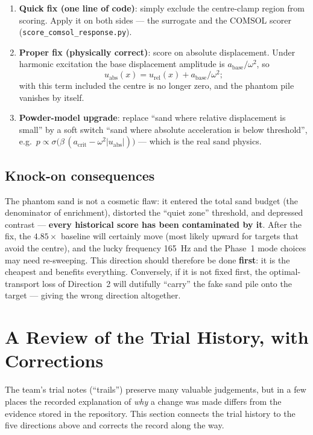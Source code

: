 \documentclass[11pt,a4paper]{article}
\newcommand{\code}[1]{\texttt{#1}}
\begin{document}
\begin{enumerate}[leftmargin=2em]
\item \textbf{Quick fix (one line of code)}: simply exclude the centre-clamp region from scoring. Apply it on both sides --- the surrogate and the COMSOL scorer (\code{score\_comsol\_response.py}).
\item \textbf{Proper fix (physically correct)}: score on absolute displacement. Under harmonic excitation the base displacement amplitude is $a_{\mathrm{base}}/\omega^2$, so
\begin{equation}
u_{\mathrm{abs}}(x) = u_{\mathrm{rel}}(x) + a_{\mathrm{base}}/\omega^{2};
\end{equation}
with this term included the centre is no longer zero, and the phantom pile vanishes by itself.
\item \textbf{Powder-model upgrade}: replace ``sand where relative displacement is small'' by a soft switch ``sand where absolute acceleration is below threshold'', e.g.\ $p \propto \sigma\!\bigl(\beta\,(a_{\mathrm{crit}}-\omega^2|u_{\mathrm{abs}}|)\bigr)$ --- which is the real sand physics.
\end{enumerate}

\subsection{Knock-on consequences}

The phantom sand is not a cosmetic flaw: it entered the total sand budget (the denominator of enrichment), distorted the ``quiet zone'' threshold, and depressed contrast --- \textbf{every historical score has been contaminated by it}. After the fix, the $4.85\times$ baseline will certainly move (most likely upward for targets that avoid the centre), and the lucky frequency 165~Hz and the Phase~1 mode choices may need re-sweeping. This direction should therefore be done \textbf{first}: it is the cheapest and benefits everything. Conversely, if it is not fixed first, the optimal-transport loss of Direction~2 will dutifully ``carry'' the fake sand pile onto the target --- giving the wrong direction altogether.

\section{A Review of the Trial History, with Corrections}

The team's trial notes (``trails'') preserve many valuable judgements, but in a few places the recorded explanation of \emph{why} a change was made differs from the evidence stored in the repository. This section connects the trial history to the five directions above and corrects the record along the way.
\end{document}
